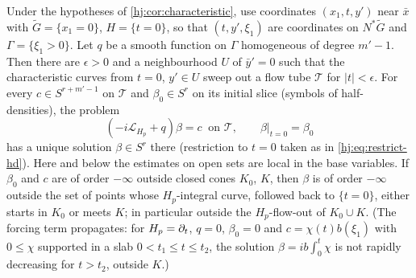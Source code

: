 \begin{lemma}\label{hj:lem:transport-ode}
  Under the hypotheses of \cref{hj:cor:characteristic}, use coordinates
  $(x_1,t,y')$ near $\bar x$ with $\tilde G=\{x_1=0\}$, $H=\{t=0\}$, so that
  $(t,y',\xi_1)$ are coordinates on $N^*\tilde G$ and $\Gamma=\{\xi_1>0\}$.  Let
  $q$ be a smooth function on $\Gamma$ homogeneous of degree $m'-1$.  Then there
  are $\epsilon>0$ and a neighbourhood $U$ of $\bar y'=0$ such that the
  characteristic curves from $t=0$, $y'\in U$ sweep out a flow tube
  $\mathcal T$ for $|t|<\epsilon$. For every $c\in S^{r+m'-1}$ on $\mathcal T$
  and $\beta_0\in S^r$ on its initial slice (symbols of half-densities),
  the problem
  \begin{equation*}
    (-i\mathcal L_{H_p}+q)\beta=c\ \text{ on }\mathcal T,\qquad
    \beta|_{t=0}=\beta_0
  \end{equation*}
  has a unique solution $\beta\in S^r$ there (restriction to $t=0$ taken as in
  \eqref{hj:eq:restrict-hd}). Here and below the estimates on open sets are
  local in the base variables.  If $\beta_0$ and $c$ are of order $-\infty$ outside
  closed cones $K_0$, $K$, then $\beta$ is of order $-\infty$ outside the set of points
  whose $H_p$-integral curve, followed back to $\{t=0\}$, either starts in $K_0$ or
  meets $K$; in particular outside the $H_p$-flow-out of $K_0\cup K$.  (The forcing
  term propagates: for $H_p=\partial_t$, $q=0$, $\beta_0=0$ and $c=\chi(t)b(\xi_1)$ with
  $0\le\chi$ supported in a slab $0<t_1\le t\le t_2$, the solution $\beta=ib\int_0^t\chi$
  is not rapidly decreasing for $t>t_2$, outside $K$.)
\end{lemma}
